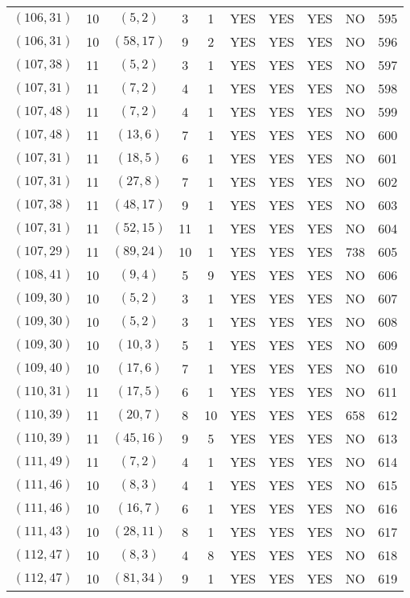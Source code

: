 \begin{longtable}{|c|c|c|c|c|c|c|c|c|c|}
$(106, 31)$ & 10 & $(5, 2)$ & 3 & 1 & YES & YES & YES & NO & 595\\
$(106, 31)$ & 10 & $(58, 17)$ & 9 & 2 & YES & YES & YES & NO & 596\\
$(107, 38)$ & 11 & $(5, 2)$ & 3 & 1 & YES & YES & YES & NO & 597\\
$(107, 31)$ & 11 & $(7, 2)$ & 4 & 1 & YES & YES & YES & NO & 598\\
$(107, 48)$ & 11 & $(7, 2)$ & 4 & 1 & YES & YES & YES & NO & 599\\
$(107, 48)$ & 11 & $(13, 6)$ & 7 & 1 & YES & YES & YES & NO & 600\\
$(107, 31)$ & 11 & $(18, 5)$ & 6 & 1 & YES & YES & YES & NO & 601\\
$(107, 31)$ & 11 & $(27, 8)$ & 7 & 1 & YES & YES & YES & NO & 602\\
$(107, 38)$ & 11 & $(48, 17)$ & 9 & 1 & YES & YES & YES & NO & 603\\
$(107, 31)$ & 11 & $(52, 15)$ & 11 & 1 & YES & YES & YES & NO & 604\\
$(107, 29)$ & 11 & $(89, 24)$ & 10 & 1 & YES & YES & YES & 738 & 605\\
$(108, 41)$ & 10 & $(9, 4)$ & 5 & 9 & YES & YES & YES & NO & 606\\
$(109, 30)$ & 10 & $(5, 2)$ & 3 & 1 & YES & YES & YES & NO & 607\\
$(109, 30)$ & 10 & $(5, 2)$ & 3 & 1 & YES & YES & YES & NO & 608\\
$(109, 30)$ & 10 & $(10, 3)$ & 5 & 1 & YES & YES & YES & NO & 609\\
$(109, 40)$ & 10 & $(17, 6)$ & 7 & 1 & YES & YES & YES & NO & 610\\
$(110, 31)$ & 11 & $(17, 5)$ & 6 & 1 & YES & YES & YES & NO & 611\\
$(110, 39)$ & 11 & $(20, 7)$ & 8 & 10 & YES & YES & YES & 658 & 612\\
$(110, 39)$ & 11 & $(45, 16)$ & 9 & 5 & YES & YES & YES & NO & 613\\
$(111, 49)$ & 11 & $(7, 2)$ & 4 & 1 & YES & YES & YES & NO & 614\\
$(111, 46)$ & 10 & $(8, 3)$ & 4 & 1 & YES & YES & YES & NO & 615\\
$(111, 46)$ & 10 & $(16, 7)$ & 6 & 1 & YES & YES & YES & NO & 616\\
$(111, 43)$ & 10 & $(28, 11)$ & 8 & 1 & YES & YES & YES & NO & 617\\
$(112, 47)$ & 10 & $(8, 3)$ & 4 & 8 & YES & YES & YES & NO & 618\\
$(112, 47)$ & 10 & $(81, 34)$ & 9 & 1 & YES & YES & YES & NO & 619\\

\end{longtable}
